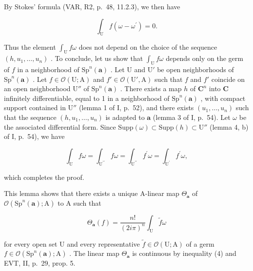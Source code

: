 By Stokes' formula (VAR, R2, p.~48, 11.2.3), we then have

\[
\int_ {\mathrm{U}} f (\omega - \omega^ {\prime}) = 0.
\]

Thus the element \(\int_{\mathrm{U}} f\omega\) does not depend on the choice of the sequence \((h, u_1, \ldots, u_n)\) . To conclude, let us show that \(\int_{\mathrm{U}} f\omega\) depends only on the germ of \(f\) in a neighborhood of \(\mathrm{Sp}^n(\boldsymbol{a})\) . Let U and \(\mathrm{U}'\) be open neighborhoods of \(\mathrm{Sp}^n(\boldsymbol{a})\) . Let \(f \in \mathcal{O}(\mathrm{U}; \mathrm{A})\) and \(f' \in \mathcal{O}(\mathrm{U}', \mathrm{A})\) such that \(f\) and \(f'\) coincide on an open neighborhood \(\mathrm{U}''\) of \(\mathrm{Sp}^n(\boldsymbol{a})\) . There exists a map \(h\) of \(\mathbf{C}^n\) into \(\mathbf{C}\) infinitely differentiable, equal to 1 in a neighborhood of \(\mathrm{Sp}^n(\boldsymbol{a})\) , with compact support contained in \(\mathrm{U}''\) (lemma 1 of I, p.~52), and there exists \((u_1, \ldots, u_n)\) such that the sequence \((h, u_1, \ldots, u_n)\) is adapted to \(\boldsymbol{a}\) (lemma 3 of I, p.~54). Let \(\omega\) be the associated differential form. Since \(\mathrm{Supp}(\omega) \subset \mathrm{Supp}(h) \subset \mathrm{U}''\) (lemma 4, b) of I, p.~54), we have

\[
\int_ {\mathrm{U}} f \omega = \int_ {\mathrm {U^ {\prime\prime}}} f \omega = \int_ {\mathrm {U^ {\prime\prime}}} f ^ {\prime} \omega = \int_ {\mathrm {U^ {\prime}}} f ^ {\prime} \omega ,
\]

which completes the proof.

This lemma shows that there exists a unique A-linear map \(\Theta_{\boldsymbol{a}}\) of \(\mathcal{O}(\mathrm{Sp}^{n}(\boldsymbol{a});\mathrm{A})\) to A such that

\[
\Theta_ {\boldsymbol {a}} (f) = \frac {n !}{(2 i \pi) ^ {n}} \int_ {\mathrm{U}} \widetilde {f} \omega\tag{5}
\]

for every open set U and every representative \(\tilde{f} \in \mathcal{O}(\mathrm{U};\mathrm{A})\) of a germ \(f \in \mathcal{O}(\mathrm{Sp}^n (\boldsymbol {a});\mathrm{A})\) . The linear map \(\Theta_{\boldsymbol{a}}\) is continuous by inequality (4) and EVT, II, p.~29, prop. 5.
\relax{}
